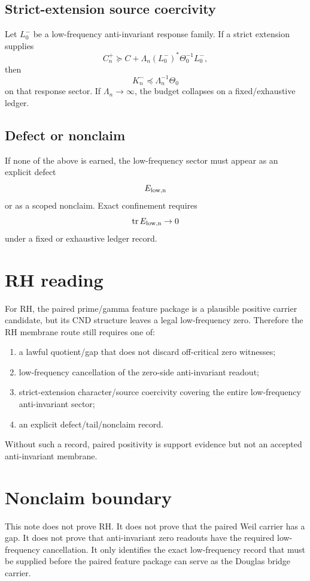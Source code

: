 \documentclass[11pt]{article}
\newcommand{\tr}{\operatorname{tr}}
\begin{document}
\subsection{Strict-extension source coercivity}
Let $L_0^-$ be a low-frequency anti-invariant response family. If a strict extension supplies
\[
  C_n^+\succeq C+\Lambda_n (L_0^-)^*\Theta_0^{-1}L_0^-,
\]
then
\[
  K_n^-\preceq \Lambda_n^{-1}\Theta_0
\]
on that response sector. If $\Lambda_n\to\infty$, the budget collapses on a fixed/exhaustive ledger.

\subsection{Defect or nonclaim}
If none of the above is earned, the low-frequency sector must appear as an explicit defect
\[
  E_{\rm low,n}
\]
or as a scoped nonclaim. Exact confinement requires
\[
  \tr E_{\rm low,n}\to0
\]
under a fixed or exhaustive ledger record.

\section{RH reading}
For RH, the paired prime/gamma feature package is a plausible positive carrier candidate, but its CND structure leaves a legal low-frequency zero. Therefore the RH membrane route still requires one of:
\begin{enumerate}[label=(\alph*)]
  \item a lawful quotient/gap that does not discard off-critical zero witnesses;
  \item low-frequency cancellation of the zero-side anti-invariant readout;
  \item strict-extension character/source coercivity covering the entire low-frequency anti-invariant sector;
  \item an explicit defect/tail/nonclaim record.
\end{enumerate}
Without such a record, paired positivity is support evidence but not an accepted anti-invariant membrane.

\section{Nonclaim boundary}
This note does not prove RH. It does not prove that the paired Weil carrier has a gap. It does not prove that anti-invariant zero readouts have the required low-frequency cancellation. It only identifies the exact low-frequency record that must be supplied before the paired feature package can serve as the Douglas bridge carrier.
\end{document}
